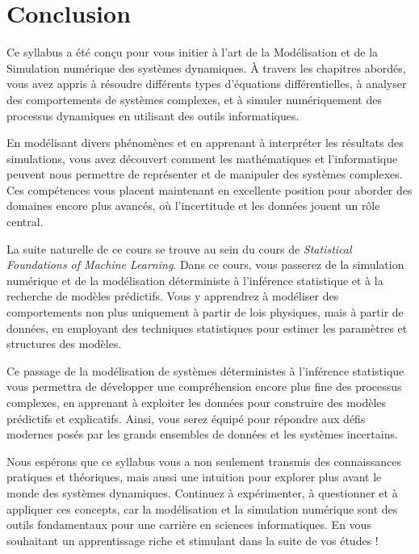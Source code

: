 \chapter{Conclusion}
    Ce syllabus a été conçu pour vous initier à l'art de la Modélisation et de la Simulation numérique des systèmes dynamiques. À travers les chapitres abordés, vous avez appris à résoudre différents types d'équations différentielles, à analyser des comportements de systèmes complexes, et à simuler numériquement des processus dynamiques en utilisant des outils informatiques.
    
    En modélisant divers phénomènes et en apprenant à interpréter les résultats des simulations, vous avez découvert comment les mathématiques et l'informatique peuvent nous permettre de représenter et de manipuler des systèmes complexes. Ces compétences vous placent maintenant en excellente position pour aborder des domaines encore plus avancés, où l'incertitude et les données jouent un rôle central.
    
    La suite naturelle de ce cours se trouve au sein du cours de \textit{Statistical Foundations of Machine Learning}. Dans ce cours, vous passerez de la simulation numérique et de la modélisation déterministe à l'inférence statistique et à la recherche de modèles prédictifs. Vous y apprendrez à modéliser des comportements non plus uniquement à partir de lois physiques, mais à partir de données, en employant des techniques statistiques pour estimer les paramètres et structures des modèles.
    
    Ce passage de la modélisation de systèmes déterministes à l'inférence statistique vous permettra de développer une compréhension encore plus fine des processus complexes, en apprenant à exploiter les données pour construire des modèles prédictifs et explicatifs. Ainsi, vous serez équipé pour répondre aux défis modernes posés par les grands ensembles de données et les systèmes incertains.
    
    Nous espérons que ce syllabus vous a non seulement transmis des connaissances pratiques et théoriques, mais aussi une intuition pour explorer plus avant le monde des systèmes dynamiques. Continuez à expérimenter, à questionner et à appliquer ces concepts, car la modélisation et la simulation numérique sont des outils fondamentaux pour une carrière en sciences informatiques. En vous souhaitant un apprentissage riche et stimulant dans la suite de vos études !
